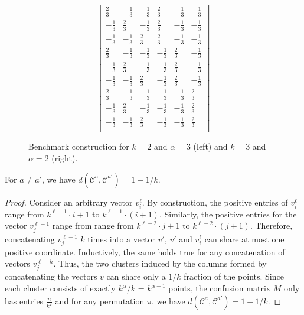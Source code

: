 \begin{figure}[h]
\begin{center}
$$%
\begin{bmatrix}
 \frac{2}{3}   & -\frac{1}{3}  & -\frac{1}{3} & \frac{2}{3}   & -\frac{1}{3}  & -\frac{1}{3}   \\
 -\frac{1}{3}  & \frac{2}{3}   & -\frac{1}{3} & \frac{2}{3}   & -\frac{1}{3}  & -\frac{1}{3}   \\
 -\frac{1}{3}  & -\frac{1}{3}  & \frac{2}{3}  & \frac{2}{3}   & -\frac{1}{3}  & -\frac{1}{3}   \\
 \frac{2}{3}   & -\frac{1}{3}  & -\frac{1}{3} & -\frac{1}{3}  & \frac{2}{3}   & -\frac{1}{3}   \\
 -\frac{1}{3}  & \frac{2}{3}   & -\frac{1}{3} & -\frac{1}{3}  & \frac{2}{3}   & -\frac{1}{3}   \\
 -\frac{1}{3}  & -\frac{1}{3}  & \frac{2}{3}  & -\frac{1}{3}  & \frac{2}{3}   &  -\frac{1}{3}  \\
 \frac{2}{3}   & -\frac{1}{3}  & -\frac{1}{3} & -\frac{1}{3}  & -\frac{1}{3}  & \frac{2}{3}    \\
 -\frac{1}{3}  & \frac{2}{3}   & -\frac{1}{3} & -\frac{1}{3}  & -\frac{1}{3}  & \frac{2}{3}    \\
 -\frac{1}{3}  & -\frac{1}{3}  & \frac{2}{3}  & -\frac{1}{3}  & -\frac{1}{3}  & \frac{2}{3}    \\
\end{bmatrix} 
$$
\end{center}
\caption{Benchmark construction for $k=2$ and $\alpha=3$ (left) and $k=3$ and $\alpha=2$ (right).}
\label{fig:benchmark-small-instances}
\end{figure}


\begin{fact}
For $a\neq a'$, we have $d(\mathcal{C}^{a},\mathcal{C}^{a'}) = 1-1/k$.
\end{fact}
\begin{proof}
Consider an arbitrary vector $v_i^{\ell}$. By construction, the positive entries of $v_i^{\ell}$ range from $k^{\ell-1}\cdot i+1$ to $k^{\ell-1}\cdot (i+1)$. Similarly, the positive entries for the vector $v_j^{\ell-1}$ range from range from $k^{\ell-2}\cdot j+1$ to $k^{\ell-2}\cdot (j+1)$. Therefore, concatenating $v_j^{\ell-1}$ $k$ times into a vector $v'$, $v'$ and $v_i^{\ell}$ can share at most one positive coordinate. Inductively, the same holds true for any concatenation of vectors $v_j^{\ell-h}$.
Thus, the two clusters induced by the columns formed by concatenating the vectors $v$ can share only a $1/k$ fraction of the points. Since each cluster consists of exactly $k^{\alpha}/k$ = $k^{\alpha-1}$ points, the confusion matrix $M$ only has entries $\frac{n}{k^2}$ and for any permutation $\pi$, we have $d(\mathcal{C}^{a},\mathcal{C}^{a'}) = 1-1/k$.
\end{proof}

